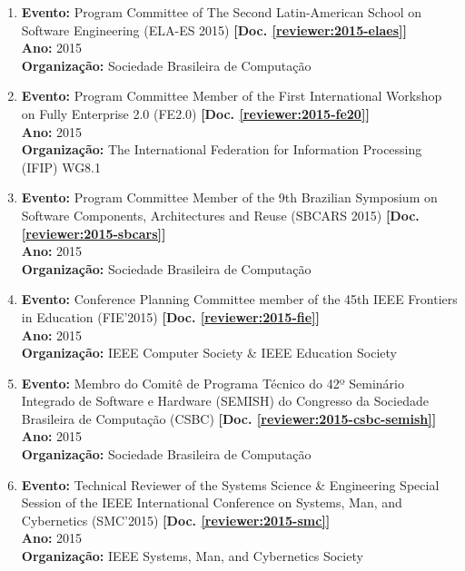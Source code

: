 \documentclass[a4paper,oneside,10pt]{article}
\begin{document}
\begin{enumerate}
\item \textbf{Evento:} Program Committee of The Second Latin-American School on Software Engineering (ELA-ES 2015) \textbf{[Doc. \ref{reviewer:2015-elaes}]}\\
      \textbf{Ano:} 2015 \\
      \textbf{Organiza\c{c}\~{a}o:} Sociedade Brasileira de Computação

\item \textbf{Evento:} Program Committee Member of the First International Workshop on Fully Enterprise 2.0 (FE2.0) \textbf{[Doc. \ref{reviewer:2015-fe20}]}\\
      \textbf{Ano:} 2015 \\
      \textbf{Organiza\c{c}\~{a}o:} The International Federation for Information Processing (IFIP) WG8.1

\item \textbf{Evento:} Program Committee Member of the 9th Brazilian Symposium on Software Components, Architectures and Reuse (SBCARS 2015) \textbf{[Doc. \ref{reviewer:2015-sbcars}]}\\
      \textbf{Ano:} 2015 \\
      \textbf{Organiza\c{c}\~{a}o:} Sociedade Brasileira de Computa\c{c}\~{a}o

\item \textbf{Evento:} Conference Planning Committee member of the 45th IEEE Frontiers in Education (FIE'2015) \textbf{[Doc. \ref{reviewer:2015-fie}]}\\
      \textbf{Ano:} 2015 \\
      \textbf{Organiza\c{c}\~{a}o:} IEEE Computer Society \& IEEE Education Society

\item \textbf{Evento:} Membro do Comitê de Programa Técnico do 42º Seminário Integrado de Software e Hardware (SEMISH) do Congresso da Sociedade Brasileira de Computação (CSBC) \textbf{[Doc. \ref{reviewer:2015-csbc-semish}]}\\
      \textbf{Ano:} 2015 \\
      \textbf{Organiza\c{c}\~{a}o:} Sociedade Brasileira de Computa\c{c}\~{a}o

\item \textbf{Evento:} Technical Reviewer of the Systems Science \& Engineering Special Session of the IEEE International Conference on Systems, Man, and Cybernetics (SMC'2015) \textbf{[Doc. \ref{reviewer:2015-smc}]}\\
      \textbf{Ano:} 2015 \\
      \textbf{Organiza\c{c}\~{a}o:} IEEE Systems, Man, and Cybernetics Society


\end{enumerate}
\end{document}
